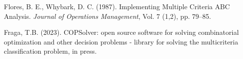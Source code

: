 \documentclass[authoryear,manuscript,12pt]{elsarticle}
\begin{document}



\begin{thebibliography}{1}


Flores, B. E., Whybark, D. C. (1987). Implementing Multiple Criteria ABC Analysis. {\it Journal of Operations Management}, Vol. 7 (1,2), pp. 79--85.

Fraga, T.B. (2023). COPSolver: open source software for solving combinatorial optimization and other decision problems - library for solving the multicriteria classification problem, in press.

\end{thebibliography}
\end{document}
